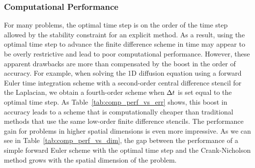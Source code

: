 \documentclass[oneeqnum,onefignum,onetabnum,onethmnum]{siamltex}
\begin{document}
\subsubsection*{\label{sec:computational_performance} 
                Computational Performance}
For many problems, the optimal time step is on the order of the time step 
allowed by the stability constraint for an explicit method.  
As a result, using the optimal time step to advance the finite
difference scheme in time may appear to be overly restrictive and lead to poor 
computational performance.  However, these apparent drawbacks are more than 
compensated by the boost in the order of accuracy.  For example, when solving 
the 1D diffusion equation using a forward Euler time integration scheme with a 
second-order central difference stencil for the Laplacian, we obtain a 
fourth-order scheme when $\Delta t$ is set equal to the optimal time step.  As
Table~\ref{tab:comp_perf_vs_err} shows, this boost in accuracy leads to a
scheme that is computationally cheaper than traditional methods that use 
the same low-order finite difference stencils.  The performance gain for 
problems in higher spatial dimensions is even more impressive.  As we can see 
in Table~\ref{tab:comp_perf_vs_dim}, the gap between the performance of a
simple forward Euler scheme with the optimal time step and the Crank-Nicholson
method grows with the spatial dimension of the problem.  
\end{document}
